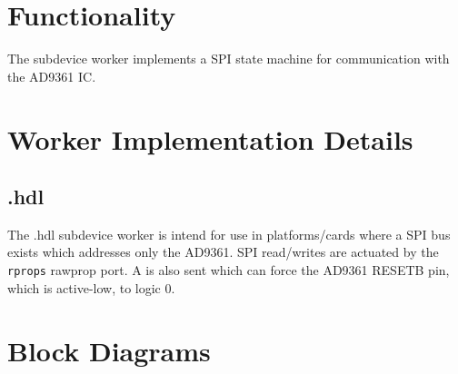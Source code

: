 \maketitle
\thispagestyle{empty}
\newpage

\def\name{\comp}
\def\workertype{}
\def\version{\ocpiversion}
\def\releasedate{06/2020}
\def\componentlibrary{ocpi.assets.devices}
\def\workers{\comp{}.hdl}
\def\testedplatforms{ML605 (FMC LPC slot), Zedboard (Vivado)}


\section*{Functionality}
	The \Comp{} subdevice worker implements a SPI state machine for communication with the AD9361 IC\cite{ad9361}.
\section*{Worker Implementation Details}
\subsection*{\comp.hdl}
The \comp{}.hdl subdevice worker is intend for use in platforms/cards where a SPI bus exists which addresses only the AD9361. SPI read/writes are actuated by the \verb+rprops+ rawprop port. A \devsignal{} is also sent which can force the AD9361 RESETB pin, which is active-low, to logic 0.
\section*{Block Diagrams}
